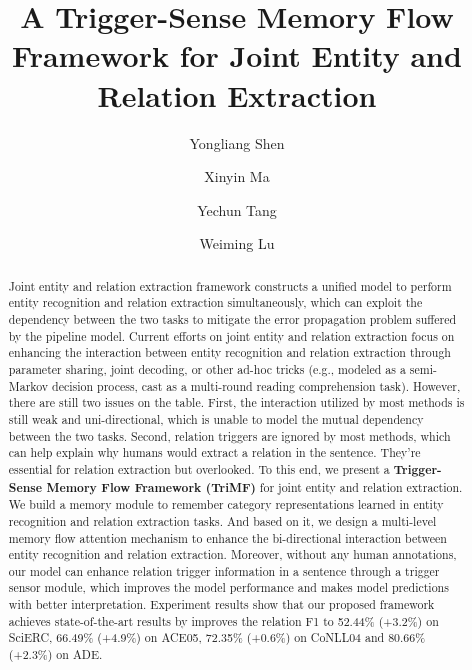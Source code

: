\documentclass[sigconf]{acmart}
\begin{document}
\title{A Trigger-Sense Memory Flow Framework for Joint Entity and Relation Extraction}



\author{Yongliang Shen}

\author{Xinyin Ma}

\author{Yechun Tang}

\author{Weiming Lu}

\renewcommand{\shortauthors}{Yongliang Shen, et al.}

\begin{abstract}

Joint entity and relation extraction framework constructs a unified model to perform entity recognition and relation extraction simultaneously, which can exploit the dependency between the two tasks to mitigate the error propagation problem suffered by the pipeline model. Current efforts on joint entity and relation extraction focus on enhancing the interaction between entity recognition and relation extraction through parameter sharing, joint decoding, or other ad-hoc tricks (e.g., modeled as a semi-Markov decision process, cast as a multi-round reading comprehension task). However, there are still two issues on the table. First, the interaction utilized by most methods is still weak and uni-directional, which is unable to model the mutual dependency between the two tasks. Second, relation triggers are ignored by most methods, which can help explain why humans would extract a relation in the sentence. They're essential for relation extraction but overlooked. To this end, we present a \textbf{Trigger-Sense Memory Flow Framework (TriMF)} for joint entity and relation extraction. We build a memory module to remember category representations learned in entity recognition and relation extraction tasks. And based on it, we design a multi-level memory flow attention mechanism to enhance the bi-directional interaction between entity recognition and relation extraction. Moreover, without any human annotations, our model can enhance relation trigger information in a sentence through a trigger sensor module, which improves the model performance and makes model predictions with better interpretation. Experiment results show that our proposed framework achieves state-of-the-art results by improves the relation F1 to 52.44\% (+3.2\%) on SciERC, 66.49\% (+4.9\%) on ACE05, 72.35\% (+0.6\%) on CoNLL04 and 80.66\% (+2.3\%) on ADE.

\end{abstract}
\end{document}
